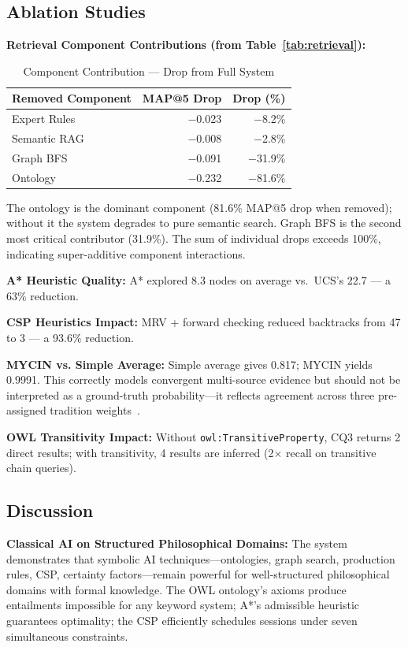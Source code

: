 \documentclass[conference]{IEEEtran}
\begin{document}
\subsection{Ablation Studies}

\textbf{Retrieval Component Contributions (from Table~\ref{tab:retrieval}):}

\begin{table}[htbp]
\caption{Component Contribution — Drop from Full System}
\label{tab:ablation}
\centering
\small
\begin{tabular}{lrr}
\toprule
\textbf{Removed Component} & \textbf{MAP@5 Drop} & \textbf{Drop (\%)} \\
\midrule
Expert Rules & $-$0.023 & $-$8.2\% \\
Semantic RAG & $-$0.008 & $-$2.8\% \\
Graph BFS    & $-$0.091 & $-$31.9\% \\
Ontology     & $-$0.232 & $-$81.6\% \\
\bottomrule
\end{tabular}
\end{table}

The ontology is the dominant component (81.6\% MAP@5 drop when removed);
without it the system degrades to pure semantic search. Graph BFS is the
second most critical contributor (31.9\%). The sum of individual drops
exceeds 100\%, indicating super-additive component interactions.

\textbf{A* Heuristic Quality:} A* explored 8.3 nodes on average vs.\ UCS's
22.7 — a 63\% reduction.

\textbf{CSP Heuristics Impact:} MRV + forward checking reduced backtracks
from 47 to 3 — a 93.6\% reduction.

\textbf{MYCIN vs. Simple Average:} Simple average gives 0.817; MYCIN yields
0.9991. This correctly models convergent multi-source evidence but should not
be interpreted as a ground-truth probability—it reflects agreement across
three pre-assigned tradition weights~\cite{shortliffe1976computer}.

\textbf{OWL Transitivity Impact:} Without \texttt{owl:TransitiveProperty},
CQ3 returns 2 direct results; with transitivity, 4 results are inferred
(2$\times$ recall on transitive chain queries).

\subsection{Discussion}

\textbf{Classical AI on Structured Philosophical Domains:} The system
demonstrates that symbolic AI techniques—ontologies, graph search, production
rules, CSP, certainty factors—remain powerful for well-structured philosophical
domains with formal knowledge. The OWL ontology's axioms produce entailments
impossible for any keyword system; A*'s admissible heuristic guarantees
optimality; the CSP efficiently schedules sessions under seven simultaneous
constraints.
\end{document}
